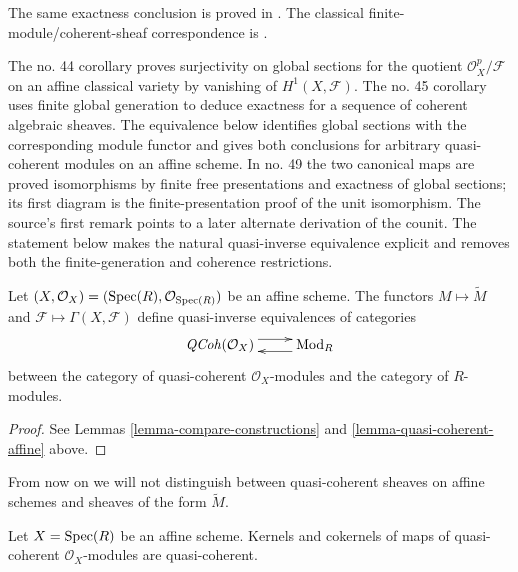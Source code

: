 \begin{lemma}
\label{lemma-equivalence-quasi-coherent}
\begin{reference}
\cite[Chapter II, \S 3, no. 44, Proposition 7, Corollary 2,
p. 237]{FAC}
The same exactness conclusion is proved in
\cite[Chapter II, \S 3, no. 45, Theorem 2, Corollary 2,
p. 238]{FAC}.
The classical finite-module/coherent-sheaf correspondence is
\cite[Chapter II, \S 4, no. 49, Theorem 1, pp. 241--242]{FAC}.
\end{reference}
\begin{history}
The no. 44 corollary proves surjectivity on global sections for the quotient
$\mathcal{O}_X^p/\mathcal{F}$ on an affine classical variety by vanishing of
$H^1(X,\mathcal{F})$. The no. 45 corollary uses finite global generation to
deduce exactness for a sequence of coherent algebraic sheaves. The equivalence
below identifies global sections with the corresponding module functor and
gives both conclusions for arbitrary quasi-coherent modules on an affine
scheme. In no. 49 the two canonical maps are proved isomorphisms by finite
free presentations and exactness of global sections; its first diagram is the
finite-presentation proof of the unit isomorphism. The source's first remark
points to a later alternate derivation of the counit. The statement below
makes the natural quasi-inverse equivalence explicit and removes both the
finite-generation and coherence restrictions.
\end{history}
Let $(X, \mathcal{O}_X) = (\mathop{\mathrm{Spec}}(R), \mathcal{O}_{\mathop{\mathrm{Spec}}(R)})$
be an affine scheme.
The functors $M \mapsto \widetilde M$ and
$\mathcal{F} \mapsto \Gamma(X, \mathcal{F})$ define quasi-inverse
equivalences of categories
$$
\xymatrix{
\QCoh(\mathcal{O}_X)
\ar@<1ex>[r]
&
\text{Mod}_R
\ar@<1ex>[l]
}
$$
between the category of quasi-coherent $\mathcal{O}_X$-modules
and the category of $R$-modules.
\end{lemma}

\begin{proof}
See Lemmas \ref{lemma-compare-constructions}
and \ref{lemma-quasi-coherent-affine} above.
\end{proof}

\noindent
From now on we will not distinguish between quasi-coherent
sheaves on affine schemes and sheaves of the form $\widetilde M$.

\begin{lemma}
\label{lemma-kernel-cokernel-quasi-coherent}
Let $X = \mathop{\mathrm{Spec}}(R)$ be an affine scheme.
Kernels and cokernels of maps of quasi-coherent
$\mathcal{O}_X$-modules are quasi-coherent.
\end{lemma}

